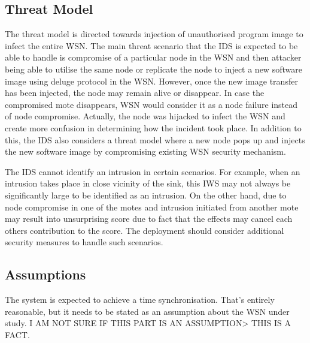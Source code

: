 \documentclass[conference,final]{IEEEtran}
\begin{document}
\subsection{Threat Model}


The threat model is directed towards injection of unauthorised program image to infect the entire WSN.
The main threat scenario that the IDS is expected to be able to handle is compromise of a particular node in the WSN and then attacker being able to utilise the same node or replicate the node to inject a new software image using deluge protocol in the WSN.
However, once the new image transfer has been injected, the node may remain alive or disappear.
In case the compromised mote disappears, WSN would consider it as a node failure instead of node compromise.
Actually, the node was hijacked to infect the WSN and create more confusion in determining how the incident took place.
In addition to this, the IDS also considers a threat model where a new node pops up and injects the new software image by compromising existing WSN security mechanism.

The IDS cannot identify an intrusion in certain scenarios.
For example, when an intrusion takes place in close vicinity of the sink, this IWS may not always be significantly large to be identified as an intrusion. On the other hand, due to node compromise in one of the motes and intrusion initiated from another mote may result into unsurprising score due to fact that the effects may cancel each others contribution to the score.
The deployment should consider additional security measures to handle such scenarios.


\subsection{Assumptions} %
\label{sc:assump}

The system is expected to achieve a time synchronisation. 
That's entirely reasonable, but it needs to be stated as an assumption about the WSN under study.
I AM NOT SURE IF THIS PART IS AN ASSUMPTION> THIS IS A FACT.
\end{document}
